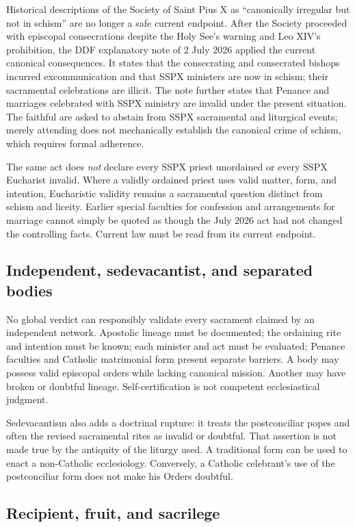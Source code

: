 Historical descriptions of the Society of Saint Pius X as “canonically irregular but not in schism” are no longer a safe current endpoint. After the Society proceeded with episcopal consecrations despite the Holy See's warning and Leo XIV's prohibition, the DDF explanatory note of 2 July 2026 applied the current canonical consequences. It states that the consecrating and consecrated bishops incurred excommunication and that SSPX ministers are now in schism; their sacramental celebrations are illicit. The note further states that Penance and marriages celebrated with SSPX ministry are invalid under the present situation. The faithful are asked to abstain from SSPX sacramental and liturgical events; merely attending does not mechanically establish the canonical crime of schism, which requires formal adherence.

The same act does \emph{not} declare every SSPX priest unordained or every SSPX Eucharist invalid. Where a validly ordained priest uses valid matter, form, and intention, Eucharistic validity remains a sacramental question distinct from schism and liceity. Earlier special faculties for confession and arrangements for marriage cannot simply be quoted as though the July 2026 act had not changed the controlling facts. Current law must be read from its current endpoint.

\subsection{Independent, sedevacantist, and separated bodies}

No global verdict can responsibly validate every sacrament claimed by an independent network. Apostolic lineage must be documented; the ordaining rite and intention must be known; each minister and act must be evaluated; Penance faculties and Catholic matrimonial form present separate barriers. A body may possess valid episcopal orders while lacking canonical mission. Another may have broken or doubtful lineage. Self-certification is not competent ecclesiastical judgment.

Sedevacantism also adds a doctrinal rupture: it treats the postconciliar popes and often the revised sacramental rites as invalid or doubtful. That assertion is not made true by the antiquity of the liturgy used. A traditional form can be used to enact a non-Catholic ecclesiology. Conversely, a Catholic celebrant's use of the postconciliar form does not make his Orders doubtful.

\subsection{Recipient, fruit, and sacrilege}

